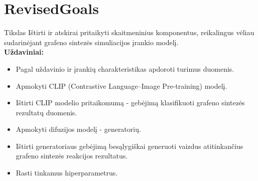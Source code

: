 \section{RevisedGoals}

\begin{frame}[c]{Tikslas}
    Ištirti ir atskirai pritaikyti skaitmeninius komponentus, reikalingus vėliau sudarinėjant grafeno sintezės simuliacijos įrankio modelį.
    \\
    \vspace{1cm}
    {\bf  Uždaviniai:}
    \begin{itemize}
        \item Pagal uždavinio ir įrankių charakteristikas apdoroti turimus duomenis.
        \item Apmokyti CLIP (Contrastive Language–Image Pre-training) modelį.
        \item Ištirti CLIP modelio pritaikomumą - gebėjimą klasifikuoti grafeno sintezės rezultatų duomenis.
        \item Apmokyti difuzijos modelį - generatorių.
        \item Ištirti generatoriaus gebėjimą besąlygiškai generuoti vaizdus atitinkančius grafeno sintezės reakcijos rezultatus.
        \item Rasti tinkamus hiperparametrus.
    \end{itemize}
\end{frame}